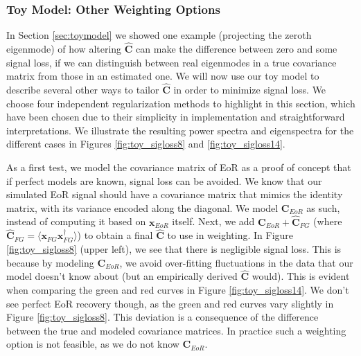 \documentclass[preprint2,numberedappendix,tighten]{aastex6}  %
\begin{document}
\subsubsection{Toy Model: Other Weighting Options}
\label{sec:otherweight}

In Section \ref{sec:toymodel} we showed one example (projecting the zeroth eigenmode) of how altering $\hat{\textbf{C}}$ can make the difference between zero and some signal loss, if we can distinguish between real eigenmodes in a true covariance matrix from those in an estimated one. We will now use our toy model to describe several other ways to tailor $\hat{\textbf{C}}$ in order to minimize signal loss. We choose four independent regularization methods to highlight in this section, which have been chosen due to their simplicity in implementation and straightforward interpretations. We illustrate the resulting power spectra and eigenspectra for the different cases in Figures \ref{fig:toy_sigloss8} and \ref{fig:toy_sigloss14}.

As a first test, we model the covariance matrix of EoR as a proof of concept that if perfect models are known, signal loss can be avoided. We know that our simulated EoR signal should have a covariance matrix that mimics the identity matrix, with its variance encoded along the diagonal. We model $\textbf{C}_{EoR}$ as such, instead of computing it based on $\textbf{x}_{EoR}$ itself. Next, we add $\textbf{C}_{EoR} + \hat{\textbf{C}}_{FG}$ (where $\hat{\textbf{C}}_{FG} = \langle\textbf{x}_{FG}\textbf{x}_{FG}^{\dagger}\rangle$) to obtain a final $\hat{\textbf{C}}$ to use in weighting. In Figure \ref{fig:toy_sigloss8} (upper left), we see that there is negligible signal loss. This is because by modeling $\textbf{C}_{EoR}$, we avoid over-fitting fluctuations in the data that our model doesn't know about (but an empirically derived $\hat{\textbf{C}}$ would). This is evident when comparing the green and red curves in Figure \ref{fig:toy_sigloss14}. We don't see perfect EoR recovery though, as the green and red curves vary slightly in Figure \ref{fig:toy_sigloss8}. This deviation is a consequence of the difference between the true and modeled covariance matrices. In practice such a weighting option is not feasible, as we do not know $\textbf{C}_{EoR}$.
\end{document}
